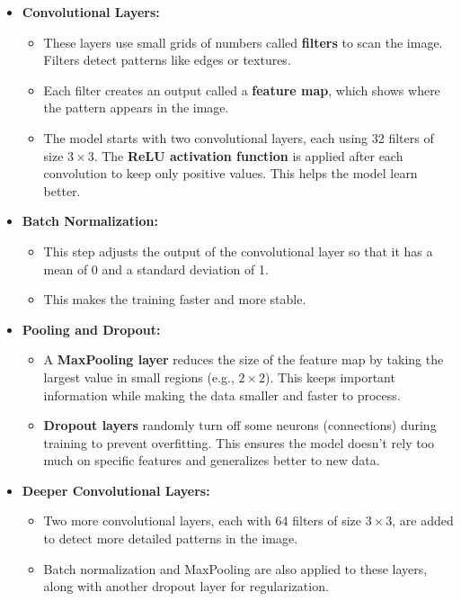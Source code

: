 \documentclass[lettersize,journal]{IEEEtran}
\begin{document}
\begin{itemize}
    \item \textbf{Convolutional Layers:}
    \begin{itemize}
        \item These layers use small grids of numbers called \textbf{filters} to scan the image. Filters detect patterns like edges or textures. 
        \item Each filter creates an output called a \textbf{feature map}, which shows where the pattern appears in the image.
        \item The model starts with two convolutional layers, each using 32 filters of size \(3 \times 3\). The \textbf{ReLU activation function} is applied after each convolution to keep only positive values. This helps the model learn better.
    \end{itemize}
    
    \item \textbf{Batch Normalization:}
    \begin{itemize}
        \item This step adjusts the output of the convolutional layer so that it has a mean of 0 and a standard deviation of 1. 
        \item This makes the training faster and more stable.
    \end{itemize}
    
    \item \textbf{Pooling and Dropout:}
    \begin{itemize}
        \item A \textbf{MaxPooling layer} reduces the size of the feature map by taking the largest value in small regions (e.g., \(2 \times 2\)). This keeps important information while making the data smaller and faster to process.
        \item \textbf{Dropout layers} randomly turn off some neurons (connections) during training to prevent overfitting. This ensures the model doesn’t rely too much on specific features and generalizes better to new data.
    \end{itemize}
    
    \item \textbf{Deeper Convolutional Layers:}
    \begin{itemize}
        \item Two more convolutional layers, each with 64 filters of size \(3 \times 3\), are added to detect more detailed patterns in the image.
        \item Batch normalization and MaxPooling are also applied to these layers, along with another dropout layer for regularization.
    \end{itemize}


\end{itemize}
\end{document}
